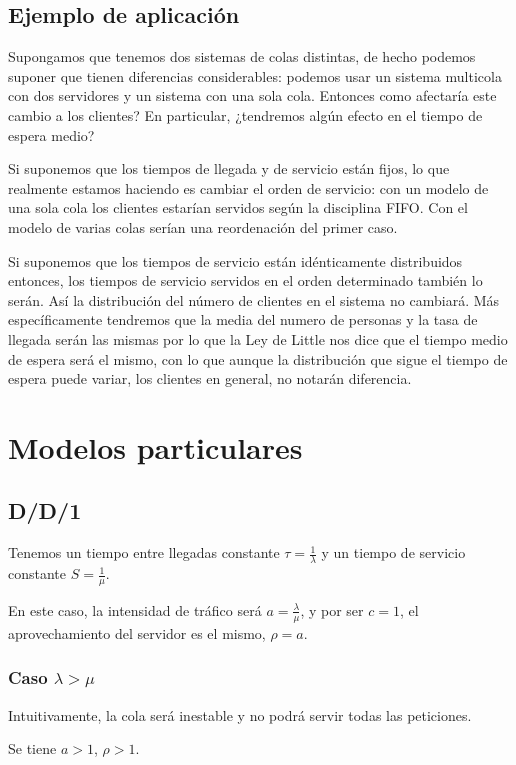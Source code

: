 \documentclass[a4paper,10pt]{scrartcl}
\theoremstyle{definition}
\theoremstyle{definition}
\numberwithin{equation}{section}
\begin{document}
	\subsection{Ejemplo de aplicación}
	Supongamos que tenemos dos sistemas de colas distintas, de hecho podemos suponer que tienen diferencias considerables: podemos usar un sistema multicola con dos servidores y un sistema con una sola cola. Entonces como afectaría este cambio a los clientes? En particular, ¿tendremos algún efecto en el tiempo de espera medio?
	
	Si suponemos que los tiempos de llegada y de servicio están fijos, lo que realmente estamos haciendo es cambiar el orden de servicio: con un modelo de una sola cola los clientes estarían servidos según la disciplina FIFO. Con el modelo de varias colas serían una reordenación del primer caso.
	
	Si suponemos que los tiempos de servicio están idénticamente distribuidos entonces, los tiempos de servicio servidos en el orden determinado también lo serán. Así la distribución del número de clientes en el sistema no cambiará. Más específicamente tendremos que la media del numero de personas y la tasa de llegada serán las mismas por lo que la Ley de Little nos dice que el tiempo medio de espera será el mismo, con lo que aunque la distribución que sigue el tiempo de espera puede variar, los clientes en general, no notarán diferencia.
	
	\section{Modelos particulares}
	\subsection{D/D/1}
	Tenemos un tiempo entre llegadas constante $\tau = \frac{1}{\lambda}$ y un tiempo de servicio constante $S = \frac{1}{\mu}$.
	
	En este caso, la intensidad de tráfico será $a=\frac{\lambda}{\mu}$, y por ser $c = 1$, el aprovechamiento del servidor es el mismo, $\rho = a$.
	
	\subsubsection{Caso $\lambda > \mu$}
	Intuitivamente, la cola será inestable y no podrá servir todas las peticiones. 
	
	Se tiene $a > 1$, $\rho > 1$.
	
\end{document}
